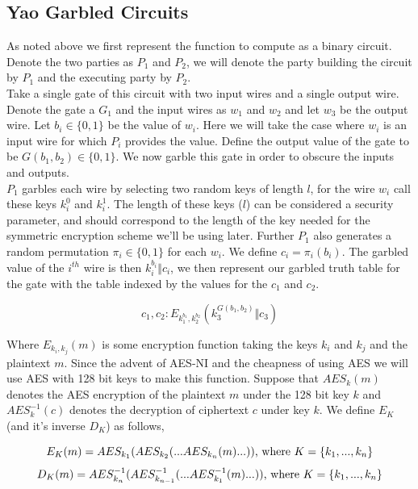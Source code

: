 \documentclass[a4paper,11pt]{article}
\begin{document}
		\subsection{Yao Garbled Circuits} \label{sub:Yao_Details}
			As noted above we first represent the function to compute as a binary circuit. Denote the two parties as $P_1$ and $P_2$, we will denote the party building the circuit by $P_1$ and the executing party by $P_2$.\\
			
			Take a single gate of this circuit with two input wires and a single output wire. Denote the gate a $G_1$ and the input wires as $w_1$ and $w_2$ and let $w_3$ be the output wire. Let $b_i \in \{0, 1\}$ be the value of $w_i$. Here we will take the case where $w_i$ is an input wire for which $P_i$ provides the value. Define the output value of the gate to be $G(b_1, b_2) \in \{0, 1\}$. We now garble this gate in order to obscure the inputs and outputs.\\

			$P_1$ garbles each wire by selecting two random keys of length $l$, for the wire $w_i$ call these keys $k_i^0$ and $k_i^1$. The length of these keys ($l$) can be considered a security parameter, and should correspond to the length of the key needed for the symmetric encryption scheme we'll be using later. Further $P_1$ also generates a random permutation $\pi_i \in \{0, 1\}$ for each $w_i$. We define $c_i = \pi_i(b_i)$. The garbled value of the $i^{th}$ wire is then $k_i^{b_i} \Vert c_i$, we then represent our garbled truth table for the gate with the table indexed by the values for the $c_1$ and $c_2$.

			$$ c_1, c_2 : E_{k_1^{b_1}, k_2^{b_2}} (k_3^{ G(b_1, b_2) } \Vert c_3) $$

			Where $E_{k_i, k_j}(m)$ is some encryption function taking the keys $k_i$ and $k_j$ and the plaintext $m$. Since the advent of AES-NI and the cheapness of using AES we will use AES with 128 bit keys to make this function. Suppose that $AES_k(m)$ denotes the AES encryption of the plaintext $m$ under the 128 bit key $k$ and $AES^{-1}_k(c)$ denotes the decryption of ciphertext $c$ under key $k$. We define $E_K$ (and it's inverse $D_K$) as follows,

			$$ E_K(m) = AES_{k_1}( AES_{k_2}( ...AES_{k_n}(m) ...) ) \textnormal{, where } K = \{k_1, ..., k_n\}$$ 
			$$ D_K(m) = AES^{-1}_{k_n}( AES^{-1}_{k_{n-1}}( ...AES^{-1}_{k_1}(m) ...) ) \textnormal{, where } K = \{k_1, ..., k_n\}$$ 
\end{document}
